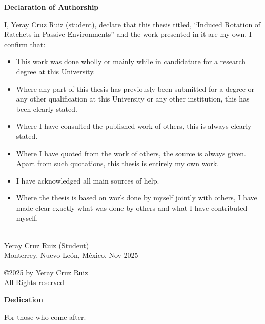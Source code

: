 \newpage %

\begin{center}
\bf{Declaration of Authorship}
\end{center}

I, Yeray Cruz Ruiz (student), declare that this thesis titled, \enquote{Induced Rotation of Ratchets in Passive Environments} and the work presented in it are my own. I confirm that:

\begin{itemize}
  \item This work was done wholly or mainly while in candidature for a research degree at this University.
  \item Where any part of this thesis has previously been submitted for a degree or any other qualification at this University or any other institution, this has been clearly stated.
  \item Where I have consulted the published work of others, this is always clearly stated.
  \item Where I have quoted from the work of others, the source is always given. Apart from such quotations, this thesis is entirely my own work.
  \item I have acknowledged all main sources of help.
  \item Where the thesis is based on work done by myself jointly with others, I have made clear exactly what was done by others and what I have contributed myself.
\end{itemize}

\vspace{5em}

\begin{flushright}
{-------------------------------------------------} \\
Yeray Cruz Ruiz (Student) \\
Monterrey, Nuevo León, México, Nov 2025
\end{flushright}

\vfill
\begin{center}
\large {\copyright 2025 by Yeray Cruz Ruiz}\\
\large{All Rights reserved}
\end{center}


\newpage %

\Huge {\bf Dedication}

\vfill
\normalsize For those who come after. 
\vfill


